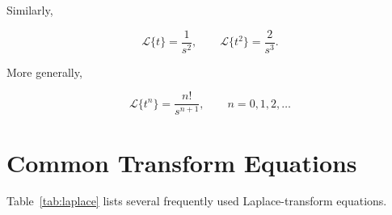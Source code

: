 \documentclass[a4paper]{article}
\begin{document}
Similarly,

\begin{equation}
    \mathcal{L}\{t\}
    = \frac{1}{s^2},
    \qquad
    \mathcal{L}\{t^2\}
    = \frac{2}{s^3}.
\end{equation}

More generally,

\begin{equation}
    \mathcal{L}\{t^n\}
    = \frac{n!}{s^{n+1}},
    \qquad n=0,1,2,\ldots
\end{equation}

\section{Common Transform Equations}

Table~\ref{tab:laplace} lists several frequently used
Laplace-transform equations.







\end{document}
